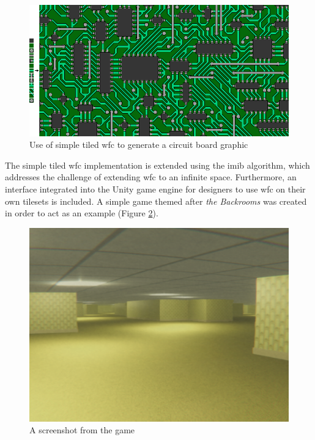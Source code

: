 \begin{figure}[H]
    \centering
    \includegraphics[width=\textwidth, height=0.3\textheight, keepaspectratio]{Images/circuit-1.png}
    \caption{Use of simple tiled \acrshort{wfc} to generate a circuit board graphic \cite{Gumin_Wave_Function_Collapse_2016}}
    \label{fig:WFCcircuit}
\end{figure}

The simple tiled \acrshort{wfc} implementation is extended using the \acrfull{imib} algorithm, which addresses the challenge of extending \acrshort{wfc} to an infinite space. Furthermore, an interface integrated into the Unity game engine for designers to use \acrshort{wfc} on their own tilesets is included. A simple game themed after \textit{the Backrooms} was created in order to act as an example (Figure \ref{fig:backroomsInGame}).

\begin{figure}[H]
    \centering
    \includegraphics[width=\textwidth, height=0.4\textheight, keepaspectratio]{Images/Backrooms.png}
    \caption{A screenshot from the game}
    \label{fig:backroomsInGame}
\end{figure}


